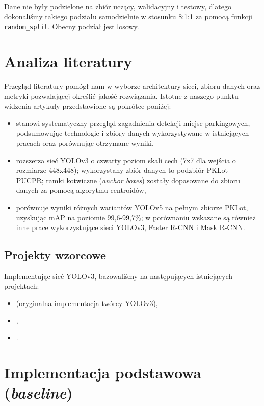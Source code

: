 \documentclass{article}
\begin{document}
Dane nie były podzielone na zbiór uczący, walidacyjny i testowy, dlatego dokonaliśmy takiego podziału samodzielnie w stosunku 8:1:1 za pomocą funkcji \texttt{random\_split}. Obecny podział jest losowy.

\section{Analiza literatury}

Przegląd literatury pomógł nam w wyborze architektury sieci, zbioru danych oraz metryki pozwalającej określić jakość rozwiązania. Istotne z naszego punktu widzenia artykuły przedstawione są pokrótce poniżej:

\begin{itemize}
    \item \citep{lisboa2022systematic} stanowi systematyczny przegląd zagadnienia detekcji miejsc parkingowych, podsumowując technologie i zbiory danych wykorzystywane w istniejących pracach oraz porównując otrzymane wyniki,
    \item \citep{ding2019vehicle} rozszerza sieć YOLOv3 o czwarty poziom skali cech (7x7 dla wejścia o rozmiarze 448x448); wykorzystany zbiór danych to podzbiór PKLot -- PUCPR; ramki kotwiczne (\textit{anchor boxes}) zostały dopasowane do zbioru danych za pomocą algorytmu centroidów,
    \item \citep{nguyenyolo5pklot} porównuje wyniki różnych wariantów YOLOv5 na pełnym zbiorze PKLot, uzyskując mAP na poziomie 99,6-99,7\%; w porównaniu wskazane są również inne prace wykorzystujące sieci YOLOv3, Faster R-CNN i Mask R-CNN.
\end{itemize}

\subsection{Projekty wzorcowe}

Implementując sieć YOLOv3, bazowaliśmy na następujących istniejących projektach:

\begin{itemize}
    \item \citep{redmon2018yolov3} (oryginalna implementacja twórcy YOLOv3),
    \item \citep{websiteyolo},
    \item \citep{yolopytorch}.
\end{itemize}

\section{Implementacja podstawowa (\textit{baseline})}
\end{document}
